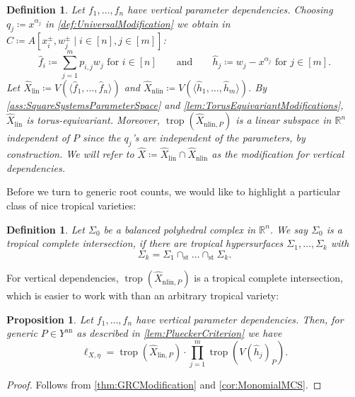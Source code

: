 \documentclass[12pt,reqno,a4paper]{amsart}
\theoremstyle{theoremstyle}
\newtheorem{proposition}[theorem]{Proposition}
\theoremstyle{examplestyle}
\newtheorem{definition}[theorem]{Definition}
\theoremstyle{algorithmstyle}
\newcommand{\RR}{\mathbb{R}}
\newcommand{\an}{{\mathrm{an}}}
\newcommand{\lin}{{\mathrm{lin}}}
\newcommand{\nlin}{{\mathrm{nlin}}}
\newcommand{\st}{{\mathrm{st}}}
\DeclareMathOperator{\trop}{trop}
\begin{document}
\begin{definition}\label{def:verticalDependenciesModification}
  Let $f_1,\dots,f_n$ have vertical parameter dependencies. Choosing $q_j\coloneqq x^{\alpha_j}$ in \cref{def:UniversalModification} we obtain in $\widehat C \coloneqq A[x_i^\pm, w_j^\pm \mid i\in[n], j\in[m]]$:
  \begin{equation*}
    \hat{f}_{i}\coloneqq\sum_{j=1}^m p_{i,j}w_j \text{ for } i\in[n] \qquad \text{and}\qquad
    \hat{h}_{j}\coloneqq w_{j}-x^{\alpha_j} \text{ for } j\in[m].
  \end{equation*}
  Let $\widehat X_\lin \coloneqq V(\langle \hat f_1,\dots, \hat f_n\rangle)$ and $\widehat X_\nlin\coloneqq V(\langle \hat h_1,\dots, \hat h_m\rangle)$.  By \cref{ass:SquareSystemsParameterSpace} and \cref{lem:TorusEquivariantModifications}, $\widehat X_\lin$ is torus-equivariant. Moreover, $\trop(\widehat X_{\nlin,P})$ is a linear subspace in $\RR^n$ independent of $P$ since the $q_{j}$'s are independent of the parameters, by construction. We will refer to $\widehat X\coloneqq \widehat X_\lin\cap\widehat X_{\nlin}$ as the \emph{modification} for vertical dependencies.
\end{definition}

Before we turn to generic root counts, we would like to highlight a particular class of nice tropical varieties:
\begin{definition}
  \label{def:tropicalCompleteIntersection}
  Let $\Sigma_0$ be a balanced polyhedral complex in $\RR^n$.  We say $\Sigma_0$ is a \emph{tropical complete intersection}, if there are tropical hypersurfaces $\Sigma_1,\dots,\Sigma_k$ with
  \begin{equation*}
    \Sigma_k=\Sigma_1\cap_\st\dots\cap_\st\Sigma_k.
  \end{equation*}
\end{definition}

For vertical dependencies, $\trop(\widehat X_{\nlin,P})$ is a tropical complete intersection, which is easier to work with than an arbitrary tropical variety:

\begin{proposition}\label{prop:verticalDependenciesRootCount}
  Let $f_1,\dots,f_n$ have vertical parameter dependencies. Then, for generic $P\in Y^\an$ as described in \cref{lem:PlueckerCriterion} we have
  \begin{equation*}
      \ell_{X,\eta}=\trop(\widehat X_{\lin,P})\cdot \prod_{j=1}^m \trop(V(\hat{h}_{j})_{P}).
  \end{equation*}
\end{proposition}
\begin{proof}
  Follows from \cref{thm:GRCModification} and \cref{cor:MonomialMCS}.
\end{proof}
\end{document}
